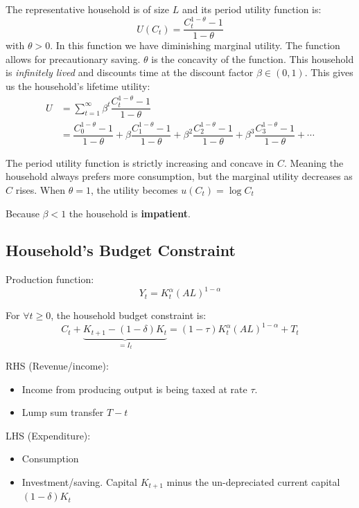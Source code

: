 \documentclass[11pt]{article}
\begin{document}
The representative household is of size $L$ and its period utility function is:
\[U(C_t) = \dfrac{C_t^{1-\theta}-1}{1-\theta}\]
with $\theta>0$. In this function we have diminishing marginal utility. The function allows for precautionary saving. $\theta$ is the concavity of the function. This household is \textit{infinitely lived} and discounts time at the discount factor $\beta \in (0,1)$. This gives us the household's lifetime utility:
\begin{equation}
\label{household utility}
    \begin{aligned}
        U &= \sum_{t=1}^\infty \beta^t \dfrac{C_t^{1-\theta}-1}{1-\theta} \\
        &= \dfrac{C_0^{1-\theta}-1}{1-\theta} + \beta \dfrac{C_1^{1-\theta}-1}{1-\theta} + \beta^2 \dfrac{C_2^{1-\theta}-1}{1-\theta} + \beta^3 \dfrac{C_3^{1-\theta}-1}{1-\theta} + \cdots
    \end{aligned}
\end{equation}

\begin{note}
    The period utility function is strictly increasing and concave in $C$. Meaning the household always prefers more consumption, but the marginal utility decreases as $C$ rises. When $\theta=1$, the utility becomes $u(C_t) = \log C_t$
\end{note}

\begin{note}
    Because $\beta<1$ the household is \textbf{impatient}.
\end{note}

\subsection{Household's Budget Constraint}

Production function: 
\[Y_t = K_t^\alpha (AL)^{1-\alpha}\]

For $\forall t \geq 0$, the household budget constraint is:
\[C_t + \underbrace{K_{t+1}-(1-\delta)K_t}_{=I_t} = (1-\tau)K_t^\alpha(AL)^{1-\alpha} + T_t\]

RHS (Revenue/income):
\begin{itemize}
    \item Income from producing output is being taxed at rate $\tau$.
    \item Lump sum transfer $T-t$
\end{itemize}

LHS (Expenditure):
\begin{itemize}
    \item Consumption
    \item Investment/saving. Capital $K_{t+1}$ minus the un-depreciated current capital $(1-\delta)K_t$
\end{itemize}
\end{document}
